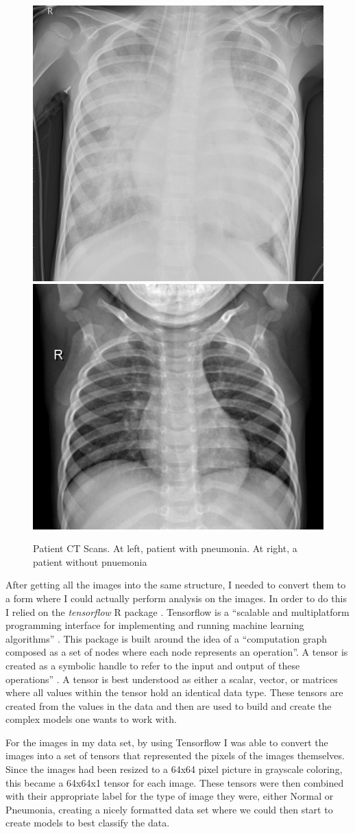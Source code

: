 \documentclass[12pt]{article}
\begin{document}
\begin{figure}
\includegraphics[width=0.49\linewidth,height=0.25\textheight]{images/pneumonia} \includegraphics[width=0.49\linewidth,height=0.25\textheight]{images/normal} \caption{Patient CT Scans. At left, patient with pneumonia. At right, a patient without pnuemonia}\label{fig:sample-fig2}
\end{figure}

After getting all the images into the same structure, I needed to
convert them to a form where I could actually perform analysis on the
images. In order to do this I relied on the \emph{tensorflow} R package
\citep{Tensorflow2}. Tensorflow is a ``scalable and multiplatform
programming interface for implementing and running machine learning
algorithms'' \citep{PML}. This package is built around the idea of a
``computation graph composed as a set of nodes where each node
represents an operation''. A tensor is created as a symbolic handle to
refer to the input and output of these operations'' \citep{PML}. A
tensor is best understood as either a scalar, vector, or matrices where
all values within the tensor hold an identical data type. These tensors
are created from the values in the data and then are used to build and
create the complex models one wants to work with.

For the images in my data set, by using Tensorflow I was able to convert
the images into a set of tensors that represented the pixels of the
images themselves. Since the images had been resized to a 64x64 pixel
picture in grayscale coloring, this became a 64x64x1 tensor for each
image. These tensors were then combined with their appropriate label for
the type of image they were, either Normal or Pneumonia, creating a
nicely formatted data set where we could then start to create models to
best classify the data.
\end{document}
